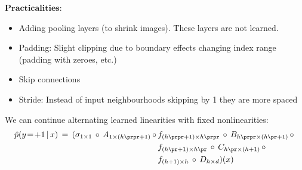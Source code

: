 ${ \textbf{Practicalities} }$: 
\begin{itemize}

\item Adding pooling layers (to shrink images). These layers are not learned. 

\item Padding: Slight clipping due to boundary effects changing index range (padding with zeroes, etc.) 

\item Skip connections 

\item Stride: Instead of input neighbourhoods skipping by 1 they are more spaced 


    
\end{itemize}     
    
        We can continue alternating learned linearities with fixed
        nonlinearities:
        \begin{align*}
          \hat p(y\!=\!+1\,|\,x) \,=\,
          (\sigma_{1\times 1} \,\circ\,
          A_{1\times (h\prpr +1)} \,\circ\,
            &f_{(h\prpr+1) \times h\prpr} \,\circ\,
          B_{h\prpr \times (h\pr+1)} \,\circ\, \\
            &f_{(h\pr+1)\times h\pr} \,\circ\,
          C_{h\pr\times (h+1)} \,\circ\, \\
            &f_{(h+1)\times h} \,\circ\,
          D_{h\times d})(x)
        \end{align*}





